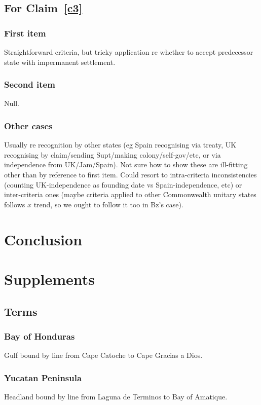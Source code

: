 \documentclass{amsart}
\theoremstyle{definition}%
\theoremstyle{definition}%
\begin{document}
\subsection{For Claim~\ref{c3}}
\subsubsection{First item} Straightforward criteria, but tricky application re whether to accept predecessor state with impermanent settlement.
\subsubsection{Second item} Null.
\subsubsection{Other cases} Usually re recognition by other states (eg Spain recognising via treaty, UK recognising by claim/sending Supt/making colony/self-gov/etc, or via independence from UK/Jam/Spain). Not sure how to show these are ill-fitting other than by reference to first item. Could resort to intra-criteria inconsistencies (counting UK-independence as founding date vs Spain-independence, etc) or inter-criteria ones (maybe criteria applied to other Commonwealth unitary states follows \(x\) trend, so we ought to follow it too in Bz's case).
%
%
%
%
\newpage%
\section{Conclusion}
\label{s:concl}
\lipsum[1][1-6]
%
%
\section{Supplements}
\label{s:supp}
\lipsum[1][1-6]
%
\subsection{Terms}%
\label{ss:terms}
\subsubsection{Bay of Honduras} Gulf bound by line from Cape Catoche to Cape Gracias a Dios.
\subsubsection{Yucatan Peninsula} Headland bound by line from Laguna de Terminos to Bay of Amatique.
%
\end{document}
